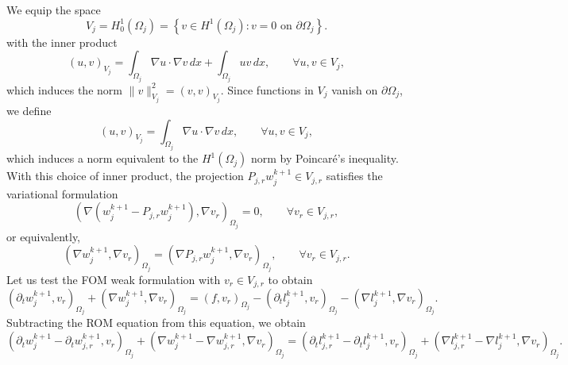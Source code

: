 \documentclass[a4paper, 11pt]{article}
\theoremstyle{remark}
\begin{document}
\vspace{10pt}
\noindent We equip the space
\begin{equation*}
    V_{j} = H^{1}_{0}(\Omega_{j}) = \left\{v\in H^{1}(\Omega_{j}) : v = 0 \text{ on } \partial\Omega_{j}\right\}.
\end{equation*}
with the inner product
\begin{equation*}
    (u,v)_{V_j} = \int_{\Omega_j} \nabla u \cdot \nabla v \, dx + \int_{\Omega_j} uv \, dx, \qquad \forall u,v \in V_j,
\end{equation*}
which induces the norm $\|v\|_{V_j}^2 = (v,v)_{V_j}$.  Since functions in $V_j$ vanish on $\partial\Omega_{j}$, we define
\begin{equation*}
    (u,v)_{V_j} = \int_{\Omega_j} \nabla u \cdot \nabla v \, dx, \qquad \forall u,v \in V_j,
\end{equation*}
which induces a norm equivalent to the $H^1(\Omega_j)$ norm by Poincaré's inequality. With this choice of inner product, the projection $P_{j,r} w_j^{k+1} \in V_{j,r}$ satisfies the variational formulation
\begin{equation*}
    \left(\nabla \left(w_j^{k+1} - P_{j,r} w_j^{k+1}\right), \nabla v_r\right)_{\Omega_j} = 0, \qquad \forall v_r \in V_{j,r},
\end{equation*}
or equivalently,
\begin{equation*}
    \left(\nabla w_j^{k+1}, \nabla v_r\right)_{\Omega_j} = \left(\nabla P_{j,r} w_j^{k+1}, \nabla v_r\right)_{\Omega_j}, \qquad \forall v_r \in V_{j,r}.
\end{equation*}
Let us test the FOM weak formulation with $v_{r}\in V_{j, r}$ to obtain
\begin{equation*}
    \left(\partial_{t} w_{j}^{k+1}, v_{r}\right)_{\Omega_{j}} + \left(\nabla w_{j}^{k+1}, \nabla v_{r}\right)_{\Omega_{j}} = \left(f, v_{r}\right)_{\Omega_{j}} - \left(\partial_{t} l_{j}^{k+1}, v_{r}\right)_{\Omega_{j}} - \left(\nabla l_{j}^{k+1}, \nabla v_{r}\right)_{\Omega_{j}}.
\end{equation*}
Subtracting the ROM equation from this equation, we obtain
\begin{equation*}
    \left(\partial_{t} w_{j}^{k+1} - \partial_{t} w_{j, r}^{k+1}, v_{r}\right)_{\Omega_{j}} + \left(\nabla w_{j}^{k+1} - \nabla w_{j, r}^{k+1}, \nabla v_{r}\right)_{\Omega_{j}} = \left(\partial_{t} l_{j, r}^{k+1} - \partial_{t} l_{j}^{k+1}, v_{r}\right)_{\Omega_{j}} + \left(\nabla l_{j, r}^{k+1} - \nabla l_{j}^{k+1}, \nabla v_{r}\right)_{\Omega_{j}}.
\end{equation*}
\end{document}
